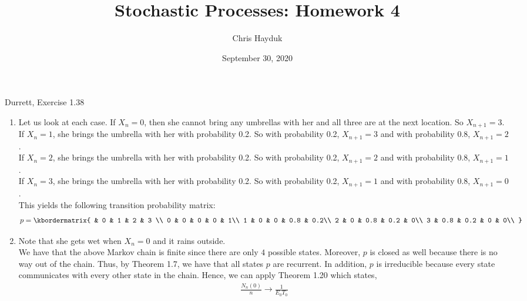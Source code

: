\documentclass[12pt]{article}
\newenvironment{problem}[2][Problem]{\begin{trivlist}
\item[\hskip \labelsep {\bfseries #1}\hskip \labelsep {\bfseries #2.}]}{\end{trivlist}}
\begin{document}
\title{Stochastic Processes: Homework 4}

\author{Chris Hayduk}
\date{September 30, 2020}

\maketitle

\begin{problem}{1}
Durrett, Exercise 1.38
\end{problem}

\begin{enumerate}[label=(\alph*)]

\item Let us look at each case. If $X_n = 0$, then she cannot bring any umbrellas with her and all three are at the next location. So $X_{n+1} = 3$.\\

If $X_n = 1$, she brings the umbrella with her with probability 0.2. So with probability 0.2, $X_{n+1} = 3$ and with probability 0.8, $X_{n+1} = 2$.\\

If $X_n = 2$, she brings the umbrella with her with probability 0.2. So with probability 0.2, $X_{n+1} = 2$ and with probability 0.8, $X_{n+1} = 1$.\\

If $X_n = 3$, she brings the umbrella with her with probability 0.2. So with probability 0.2, $X_{n+1} = 1$ and with probability 0.8, $X_{n+1} = 0$.\\

This yields the following transition probability matrix:
\begin{align*}
p = \kbordermatrix{
    & 0 & 1 & 2 & 3 \\
    0 & 0 & 0 & 0 & 1\\
    1 & 0 & 0 & 0.8 & 0.2\\
    2 & 0 & 0.8 & 0.2 & 0\\
    3 & 0.8 & 0.2 & 0 & 0\\
  }
\end{align*}

\item Note that she gets wet when $X_n = 0$ and it rains outside.\\

We have that the above Markov chain is finite since there are only $4$ possible states. Moreover, $p$ is closed as well because there is no way out of the chain. Thus, by Theorem 1.7, we have that all states $p$ are recurrent. In addition, $p$ is irreducible because every state communicates with every other state in the chain. Hence, we can apply Theorem 1.20 which states,
\begin{align*}
\frac{N_n(0)}{n} \to \frac{1}{E_0T_0}
\end{align*}


\end{enumerate}
\end{document}
